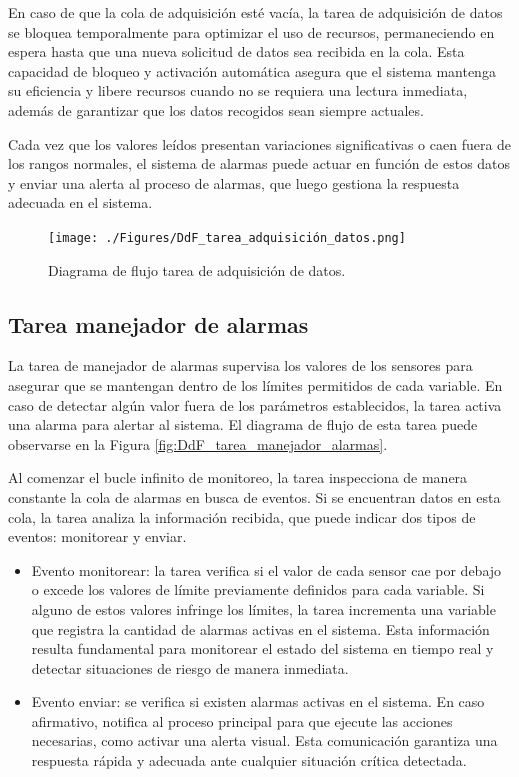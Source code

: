 En caso de que la cola de adquisición esté vacía, la tarea de adquisición de datos se bloquea temporalmente para optimizar el uso de recursos, permaneciendo en espera hasta que una nueva solicitud de datos sea recibida en la cola. Esta capacidad de bloqueo y activación automática asegura que el sistema mantenga su eficiencia y libere recursos cuando no se requiera una lectura inmediata, además de garantizar que los datos recogidos sean siempre actuales.

Cada vez que los valores leídos presentan variaciones significativas o caen fuera de los rangos normales, el sistema de alarmas puede actuar en función de estos datos y enviar una alerta al proceso de alarmas, que luego gestiona la respuesta adecuada en el sistema.

\vspace{1cm}
\begin{figure}[htbp]
	\centering
	\texttt{[image: ./Figures/DdF\_tarea\_adquisición\_datos.png]}
	\caption{Diagrama de flujo tarea de adquisición de datos.}
	\label{fig:DdF_tarea_adquisición_datos}
\end{figure}
\vspace{1cm}

\subsection{Tarea manejador de alarmas}

La tarea de manejador de alarmas supervisa los valores de los sensores para asegurar que se mantengan dentro de los límites permitidos de cada variable. En caso de detectar algún valor fuera de los parámetros establecidos, la tarea activa una alarma para alertar al sistema. El diagrama de flujo de esta tarea puede observarse en la Figura \ref{fig:DdF_tarea_manejador_alarmas}.

Al comenzar el bucle infinito de monitoreo, la tarea inspecciona de manera constante la cola de alarmas en busca de eventos. Si se encuentran datos en esta cola, la tarea analiza la información recibida, que puede indicar dos tipos de eventos: monitorear y enviar.

\begin{itemize}
\item Evento monitorear: la tarea verifica si el valor de cada sensor cae por debajo o excede los valores de límite previamente definidos para cada variable. Si alguno de estos valores infringe los límites, la tarea incrementa una variable que registra la cantidad de alarmas activas en el sistema. Esta información resulta fundamental para monitorear el estado del sistema en tiempo real y detectar situaciones de riesgo de manera inmediata.
\item Evento enviar: se verifica si existen alarmas activas en el sistema. En caso afirmativo, notifica al proceso principal para que ejecute las acciones necesarias, como activar una alerta visual. Esta comunicación garantiza una respuesta rápida y adecuada ante cualquier situación crítica detectada.
\end{itemize}

